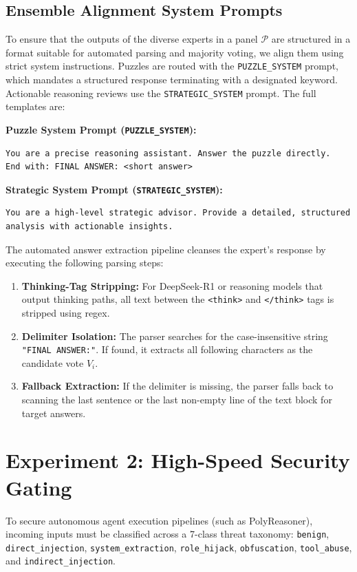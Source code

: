 \documentclass[11pt,a4paper]{article}
\begin{document}
\subsection{Ensemble Alignment System Prompts}

To ensure that the outputs of the diverse experts in a panel $\mathcal{P}$ are structured in a format suitable for automated parsing and majority voting, we align them using strict system instructions. Puzzles are routed with the \texttt{PUZZLE\_SYSTEM} prompt, which mandates a structured response terminating with a designated keyword. Actionable reasoning reviews use the \texttt{STRATEGIC\_SYSTEM} prompt. The full templates are:

\noindent\textbf{Puzzle System Prompt (\texttt{PUZZLE\_SYSTEM}):}
\begin{verbatim}
You are a precise reasoning assistant. Answer the puzzle directly.
End with: FINAL ANSWER: <short answer>
\end{verbatim}

\noindent\textbf{Strategic System Prompt (\texttt{STRATEGIC\_SYSTEM}):}
\begin{verbatim}
You are a high-level strategic advisor. Provide a detailed, structured 
analysis with actionable insights.
\end{verbatim}

The automated answer extraction pipeline cleanses the expert's response by executing the following parsing steps:
\begin{enumerate}
    \item \textbf{Thinking-Tag Stripping:} For DeepSeek-R1 or reasoning models that output thinking paths, all text between the \texttt{<think>} and \texttt{</think>} tags is stripped using regex.
    \item \textbf{Delimiter Isolation:} The parser searches for the case-insensitive string \texttt{"FINAL ANSWER:"}. If found, it extracts all following characters as the candidate vote $V_i$.
    \item \textbf{Fallback Extraction:} If the delimiter is missing, the parser falls back to scanning the last sentence or the last non-empty line of the text block for target answers.
\end{enumerate}

\section{Experiment 2: High-Speed Security Gating}

To secure autonomous agent execution pipelines (such as PolyReasoner), incoming inputs must be classified across a 7-class threat taxonomy: \texttt{benign}, \texttt{direct\_injection}, \texttt{system\_extraction}, \texttt{role\_hijack}, \texttt{obfuscation}, \texttt{tool\_abuse}, and \texttt{indirect\_injection}.
\end{document}
